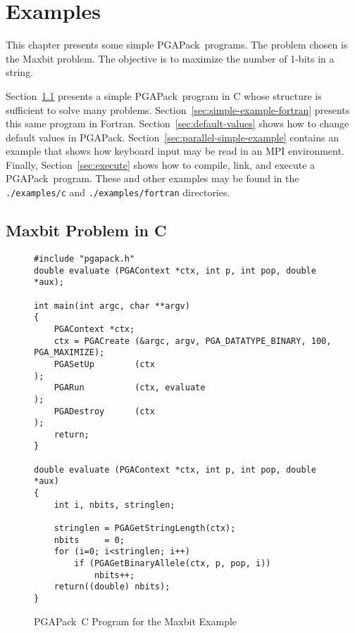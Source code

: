 \documentclass{report}
\newcommand{\pga}{PGAPack}
\begin{document}
\chapter{Examples}\label{chp:examples}

This chapter presents some simple \pga\ programs.  The problem chosen is the
Maxbit problem.  The objective is to maximize the number of 1-bits in a
string.  

Section~\ref{sec:simple-example} presents a simple \pga\ program in C
whose structure is sufficient to solve many problems.
Section~\ref{sec:simple-example-fortran} presents this same program in Fortran.
Section~\ref{sec:default-values} shows how to change default values in \pga.
Section~\ref{sec:parallel-simple-example} contains an example that shows how
keyboard input may be read in an MPI environment.  Finally,
Section~\ref{sec:execute} shows how to compile, link, and execute a
\pga\ program.  These and other examples may be found in the {\tt
./examples/c} and {\tt ./examples/fortran} directories.



\section{Maxbit Problem in C}\label{sec:simple-example}

\begin{figure}
\begin{verbatim}
#include "pgapack.h"
double evaluate (PGAContext *ctx, int p, int pop, double *aux);

int main(int argc, char **argv)
{
    PGAContext *ctx; 
    ctx = PGACreate (&argc, argv, PGA_DATATYPE_BINARY, 100, PGA_MAXIMIZE);
    PGASetUp        (ctx                                                );
    PGARun          (ctx, evaluate                                      );
    PGADestroy      (ctx                                                );
    return;
}

double evaluate (PGAContext *ctx, int p, int pop, double *aux)
{
    int i, nbits, stringlen;

    stringlen = PGAGetStringLength(ctx);
    nbits     = 0;
    for (i=0; i<stringlen; i++)
        if (PGAGetBinaryAllele(ctx, p, pop, i))
            nbits++;
    return((double) nbits);
}
\end{verbatim}
\caption{\pga\ C Program for the Maxbit Example}\label{example:simple-main}
\end{figure}
\end{document}
